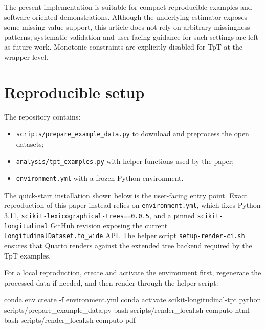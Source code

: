\documentclass[
]{article}
\newenvironment{Shaded}{}{}
\newcommand{\AttributeTok}[1]{\textcolor[rgb]{0.49,0.56,0.16}{#1}}
\newcommand{\ExtensionTok}[1]{#1}
\newcommand{\FunctionTok}[1]{\textcolor[rgb]{0.02,0.16,0.49}{#1}}
\newcommand{\NormalTok}[1]{#1}
\providecommand{\tightlist}{%
  \setlength{\itemsep}{0pt}\setlength{\parskip}{0pt}}
\begin{document}
The present implementation is suitable for compact reproducible examples
and software-oriented demonstrations. Although the underlying estimator
exposes some missing-value support, this article does not rely on
arbitrary missingness patterns; systematic validation and user-facing
guidance for such settings are left as future work. Monotonic
constraints are explicitly disabled for TpT at the wrapper level.

\section{Reproducible setup}\label{reproducible-setup}

The repository contains:

\begin{itemize}
\tightlist
\item
  \texttt{scripts/prepare\_example\_data.py} to download and preprocess
  the open datasets;
\item
  \texttt{analysis/tpt\_examples.py} with helper functions used by the
  paper;
\item
  \texttt{environment.yml} with a frozen Python environment.
\end{itemize}

The quick-start installation shown below is the user-facing entry point.
Exact reproduction of this paper instead relies on
\texttt{environment.yml}, which fixes Python 3.11,
\texttt{scikit-lexicographical-trees==0.0.5}, and a pinned
\texttt{scikit-longitudinal} GitHub revision exposing the current
\texttt{LongitudinalDataset.to\_wide} API. The helper script
\texttt{setup-render-ci.sh} ensures that Quarto renders against the
extended tree backend required by the TpT examples.

For a local reproduction, create and activate the environment first,
regenerate the processed data if needed, and then render through the
helper script:

\begin{Shaded}
\begin{Highlighting}[]
\ExtensionTok{conda}\NormalTok{ env create }\AttributeTok{{-}f}\NormalTok{ environment.yml}
\ExtensionTok{conda}\NormalTok{ activate scikit{-}longitudinal{-}tpt}
\ExtensionTok{python}\NormalTok{ scripts/prepare\_example\_data.py}
\FunctionTok{bash}\NormalTok{ scripts/render\_local.sh computo{-}html}
\FunctionTok{bash}\NormalTok{ scripts/render\_local.sh computo{-}pdf}
\end{Highlighting}
\end{Shaded}
\end{document}
